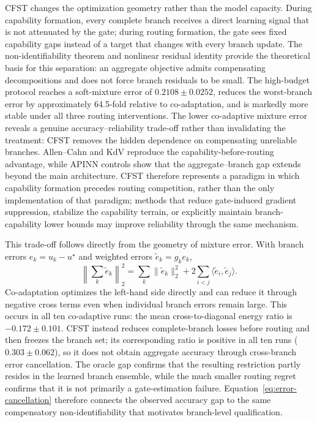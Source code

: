 \documentclass[preprint,12pt]{elsarticle}
\theoremstyle{remark}
\begin{document}
CFST changes the optimization geometry rather than the model capacity. During capability formation, every complete branch receives a direct learning signal that is not attenuated by the gate; during routing formation, the gate sees fixed capability gaps instead of a target that changes with every branch update. The non-identifiability theorem and nonlinear residual identity provide the theoretical basis for this separation: an aggregate objective admits compensating decompositions and does not force branch residuals to be small. The high-budget protocol reaches a soft-mixture error of $0.2108\pm0.0252$, reduces the worst-branch error by approximately 64.5-fold relative to co-adaptation, and is markedly more stable under all three routing interventions. The lower co-adaptive mixture error reveals a genuine accuracy--reliability trade-off rather than invalidating the treatment: CFST removes the hidden dependence on compensating unreliable branches. Allen--Cahn and KdV reproduce the capability-before-routing advantage, while APINN controls show that the aggregate--branch gap extends beyond the main architecture. CFST therefore represents a paradigm in which capability formation precedes routing competition, rather than the only implementation of that paradigm; methods that reduce gate-induced gradient suppression, stabilize the capability terrain, or explicitly maintain branch-capability lower bounds may improve reliability through the same mechanism.

This trade-off follows directly from the geometry of mixture error. With branch errors $e_k=u_k-u^\star$ and weighted errors $\widetilde e_k=g_ke_k$,
\begin{equation}
\left\|\sum_k\widetilde e_k\right\|_2^2
=\sum_k\|\widetilde e_k\|_2^2
+2\sum_{i<j}\langle\widetilde e_i,\widetilde e_j\rangle.
\label{eq:error-cancellation}
\end{equation}
Co-adaptation optimizes the left-hand side directly and can reduce it through negative cross terms even when individual branch errors remain large. This occurs in all ten co-adaptive runs: the mean cross-to-diagonal energy ratio is $-0.172\pm0.101$. CFST instead reduces complete-branch losses before routing and then freezes the branch set; its corresponding ratio is positive in all ten runs ($0.303\pm0.062$), so it does not obtain aggregate accuracy through cross-branch error cancellation. The oracle gap confirms that the resulting restriction partly resides in the learned branch ensemble, while the much smaller routing regret confirms that it is not primarily a gate-estimation failure. Equation~\eqref{eq:error-cancellation} therefore connects the observed accuracy gap to the same compensatory non-identifiability that motivates branch-level qualification.
\end{document}
